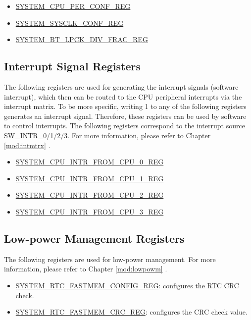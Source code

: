 \documentclass[main\_\_EN.tex]{subfiles}
\begin{document}
\begin{itemize}
    \item \hyperref[regdesc:SYSTEMCPUPERCONFREG]{SYSTEM\_CPU\_PER\_CONF\_REG}
    \item \hyperref[regdesc:SYSTEMSYSCLKCONFREG]{SYSTEM\_SYSCLK\_CONF\_REG}
    \item \hyperref[regdesc:SYSTEMBTLPCKDIVFRACREG]{SYSTEM\_BT\_LPCK\_DIV\_FRAC\_REG}
\end{itemize}

\subsection{Interrupt Signal Registers}

The following registers are used for generating the interrupt signals (software interrupt), which then can be routed to the CPU peripheral interrupts via the interrupt matrix. To be more specific, writing 1 to any of the following registers generates an interrupt signal. Therefore, these registers can be used by software to control interrupts. The following registers correspond to the interrupt source SW\_INTR\_0/1/2/3. For more information, please refer to Chapter \ref{mod:intmtrx}
\textit{}.

\begin{itemize}
    \item \hyperref[regdesc:SYSTEMCPUINTRFROMCPU0REG]{SYSTEM\_CPU\_INTR\_FROM\_CPU\_0\_REG}
    \item \hyperref[regdesc:SYSTEMCPUINTRFROMCPU1REG]{SYSTEM\_CPU\_INTR\_FROM\_CPU\_1\_REG}
    \item \hyperref[regdesc:SYSTEMCPUINTRFROMCPU2REG]{SYSTEM\_CPU\_INTR\_FROM\_CPU\_2\_REG}
    \item \hyperref[regdesc:SYSTEMCPUINTRFROMCPU3REG]{SYSTEM\_CPU\_INTR\_FROM\_CPU\_3\_REG}
\end{itemize}

\subsection{Low-power Management Registers}

The following registers are used for low-power management. For more information, please refer to Chapter \ref{mod:lowpowm} \textit{}.
\begin{itemize}
    \item \hyperref[regdesc:SYSTEMRTCFASTMEMCONFIGREG]{SYSTEM\_RTC\_FASTMEM\_CONFIG\_REG}: configures the RTC CRC check.
    \item \hyperref[regdesc:SYSTEMRTCFASTMEMCRCREG]{SYSTEM\_RTC\_FASTMEM\_CRC\_REG}: configures the CRC check value.
\end{itemize}
\end{document}
